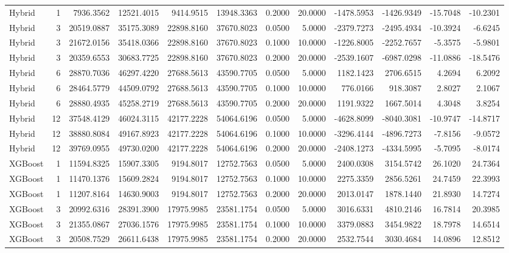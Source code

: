\begin{tabular}{lrrrrrrrrrrr}
Hybrid & 1 & 7936.3562 & 12521.4015 & 9414.9515 & 13948.3363 & 0.2000 & 20.0000 & -1478.5953 & -1426.9349 & -15.7048 & -10.2301 \\
Hybrid & 3 & 20519.0887 & 35175.3089 & 22898.8160 & 37670.8023 & 0.0500 & 5.0000 & -2379.7273 & -2495.4934 & -10.3924 & -6.6245 \\
Hybrid & 3 & 21672.0156 & 35418.0366 & 22898.8160 & 37670.8023 & 0.1000 & 10.0000 & -1226.8005 & -2252.7657 & -5.3575 & -5.9801 \\
Hybrid & 3 & 20359.6553 & 30683.7725 & 22898.8160 & 37670.8023 & 0.2000 & 20.0000 & -2539.1607 & -6987.0298 & -11.0886 & -18.5476 \\
Hybrid & 6 & 28870.7036 & 46297.4220 & 27688.5613 & 43590.7705 & 0.0500 & 5.0000 & 1182.1423 & 2706.6515 & 4.2694 & 6.2092 \\
Hybrid & 6 & 28464.5779 & 44509.0792 & 27688.5613 & 43590.7705 & 0.1000 & 10.0000 & 776.0166 & 918.3087 & 2.8027 & 2.1067 \\
Hybrid & 6 & 28880.4935 & 45258.2719 & 27688.5613 & 43590.7705 & 0.2000 & 20.0000 & 1191.9322 & 1667.5014 & 4.3048 & 3.8254 \\
Hybrid & 12 & 37548.4129 & 46024.3115 & 42177.2228 & 54064.6196 & 0.0500 & 5.0000 & -4628.8099 & -8040.3081 & -10.9747 & -14.8717 \\
Hybrid & 12 & 38880.8084 & 49167.8923 & 42177.2228 & 54064.6196 & 0.1000 & 10.0000 & -3296.4144 & -4896.7273 & -7.8156 & -9.0572 \\
Hybrid & 12 & 39769.0955 & 49730.0200 & 42177.2228 & 54064.6196 & 0.2000 & 20.0000 & -2408.1273 & -4334.5995 & -5.7095 & -8.0174 \\
XGBoost & 1 & 11594.8325 & 15907.3305 & 9194.8017 & 12752.7563 & 0.0500 & 5.0000 & 2400.0308 & 3154.5742 & 26.1020 & 24.7364 \\
XGBoost & 1 & 11470.1376 & 15609.2824 & 9194.8017 & 12752.7563 & 0.1000 & 10.0000 & 2275.3359 & 2856.5261 & 24.7459 & 22.3993 \\
XGBoost & 1 & 11207.8164 & 14630.9003 & 9194.8017 & 12752.7563 & 0.2000 & 20.0000 & 2013.0147 & 1878.1440 & 21.8930 & 14.7274 \\
XGBoost & 3 & 20992.6316 & 28391.3900 & 17975.9985 & 23581.1754 & 0.0500 & 5.0000 & 3016.6331 & 4810.2146 & 16.7814 & 20.3985 \\
XGBoost & 3 & 21355.0867 & 27036.1576 & 17975.9985 & 23581.1754 & 0.1000 & 10.0000 & 3379.0883 & 3454.9822 & 18.7978 & 14.6514 \\
XGBoost & 3 & 20508.7529 & 26611.6438 & 17975.9985 & 23581.1754 & 0.2000 & 20.0000 & 2532.7544 & 3030.4684 & 14.0896 & 12.8512 \\

\end{tabular}
